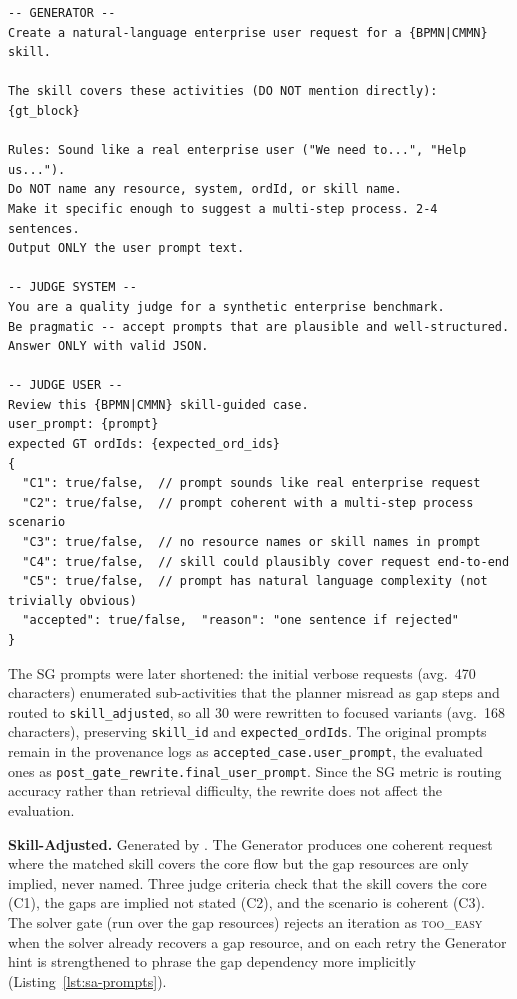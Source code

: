 \begin{lstlisting}[float=!t, floatplacement=!t, basicstyle=\ttfamily\scriptsize, breaklines=true, frame=single, label={lst:sg-prompts}, caption={SG Generator + Judge prompts.}]
-- GENERATOR --
Create a natural-language enterprise user request for a {BPMN|CMMN} skill.

The skill covers these activities (DO NOT mention directly):
{gt_block}

Rules: Sound like a real enterprise user ("We need to...", "Help us...").
Do NOT name any resource, system, ordId, or skill name.
Make it specific enough to suggest a multi-step process. 2-4 sentences.
Output ONLY the user prompt text.

-- JUDGE SYSTEM --
You are a quality judge for a synthetic enterprise benchmark.
Be pragmatic -- accept prompts that are plausible and well-structured.
Answer ONLY with valid JSON.

-- JUDGE USER --
Review this {BPMN|CMMN} skill-guided case.
user_prompt: {prompt}
expected GT ordIds: {expected_ord_ids}
{
  "C1": true/false,  // prompt sounds like real enterprise request
  "C2": true/false,  // prompt coherent with a multi-step process scenario
  "C3": true/false,  // no resource names or skill names in prompt
  "C4": true/false,  // skill could plausibly cover request end-to-end
  "C5": true/false,  // prompt has natural language complexity (not trivially obvious)
  "accepted": true/false,  "reason": "one sentence if rejected"
}
\end{lstlisting}

The SG prompts were later shortened: the initial verbose requests (avg.\ 470 characters) enumerated sub-activities that the planner misread as gap steps and routed to \texttt{skill\_adjusted}, so all 30 were rewritten to focused variants (avg.\ 168 characters), preserving \texttt{skill\_id} and \texttt{expected\_ordIds}. The original prompts remain in the provenance logs as \texttt{accepted\_case.user\_prompt}, the evaluated ones as \texttt{post\_gate\_rewrite.final\_user\_prompt}. Since the SG metric is routing accuracy rather than retrieval difficulty, the rewrite does not affect the evaluation.

\medskip\noindent\textbf{Skill-Adjusted.} Generated by . The Generator produces one coherent request where the matched skill covers the core flow but the gap resources are only implied, never named. Three judge criteria check that the skill covers the core (C1), the gaps are implied not stated (C2), and the scenario is coherent (C3). The solver gate (run over the gap resources) rejects an iteration as \textsc{too\_easy} when the solver already recovers a gap resource, and on each retry the Generator hint is strengthened to phrase the gap dependency more implicitly (Listing~\ref{lst:sa-prompts}).

